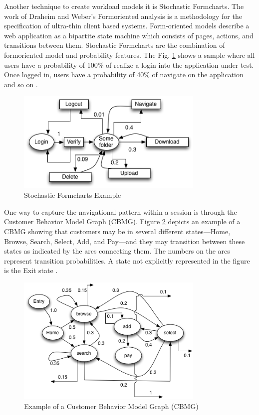 Another technique to create workload models it is Stochastic Formcharts. The work of Draheim and Weber’s Formoriented analysis is a methodology for the specification of ultra-thin client based systems. Form-oriented models describe a web application as a bipartite state machine which consists of pages, actions, and transitions between them. Stochastic Formcharts are the combination of formoriented model and probability features. The Fig. \ref{fig:stform} shows a sample where all users have a probability of 100\% of realize a login into the application under test. Once logged in, users have a probability of 40\% of navigate on the application and so on \cite{Draheim2006b}.


\begin{figure}[!ht]
\centering
\includegraphics[width=0.8\textwidth]{./images/stochastic.png}
\caption{Stochastic Formcharts Example \cite{Draheim2006b} \cite{Wang2013}}
\label{fig:stform}
\end{figure}

One way to capture the navigational pattern within a session is through the Customer Behavior Model Graph (CBMG). Figure \ref{fig:cbmg} depicts an example of a CBMG showing that customers may be in several different states—Home, Browse, Search, Select, Add, and Pay—and they may transition between these states as indicated by the arcs connecting them. The numbers on the arcs represent transition probabilities. A state not explicitly represented in the figure is the Exit state \cite{Menasce2002a} \cite{Jiang2010} \cite{MohammadS.Obaidat}. 

\begin{figure}[!ht]
\centering
\includegraphics[width=0.8\textwidth]{./images/cbmg.png}
\caption{Example of a Customer Behavior Model Graph (CBMG)  \cite{Menasce2002a} \cite{Jiang2010} \cite{MohammadS.Obaidat}}
\label{fig:cbmg}
\end{figure}

